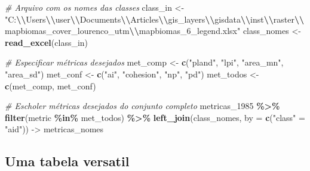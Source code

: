 \documentclass[
]{article}
\newenvironment{Shaded}{\begin{snugshade}}{\end{snugshade}}
\newcommand{\AttributeTok}[1]{\textcolor[rgb]{0.13,0.29,0.53}{#1}}
\newcommand{\CommentTok}[1]{\textcolor[rgb]{0.56,0.35,0.01}{\textit{#1}}}
\newcommand{\FunctionTok}[1]{\textcolor[rgb]{0.13,0.29,0.53}{\textbf{#1}}}
\newcommand{\NormalTok}[1]{#1}
\newcommand{\OtherTok}[1]{\textcolor[rgb]{0.56,0.35,0.01}{#1}}
\newcommand{\SpecialCharTok}[1]{\textcolor[rgb]{0.81,0.36,0.00}{\textbf{#1}}}
\newcommand{\StringTok}[1]{\textcolor[rgb]{0.31,0.60,0.02}{#1}}
\begin{document}
\begin{Shaded}
\begin{Highlighting}[]
\CommentTok{\# Arquivo com os nomes das classes}
\NormalTok{class\_in }\OtherTok{\textless{}{-}} \StringTok{"C:}\SpecialCharTok{\textbackslash{}\textbackslash{}}\StringTok{Users}\SpecialCharTok{\textbackslash{}\textbackslash{}}\StringTok{user}\SpecialCharTok{\textbackslash{}\textbackslash{}}\StringTok{Documents}\SpecialCharTok{\textbackslash{}\textbackslash{}}\StringTok{Articles}\SpecialCharTok{\textbackslash{}\textbackslash{}}\StringTok{gis\_layers}\SpecialCharTok{\textbackslash{}\textbackslash{}}\StringTok{gisdata}\SpecialCharTok{\textbackslash{}\textbackslash{}}\StringTok{inst}\SpecialCharTok{\textbackslash{}\textbackslash{}}\StringTok{raster}\SpecialCharTok{\textbackslash{}\textbackslash{}}\StringTok{mapbiomas\_cover\_lourenco\_utm}\SpecialCharTok{\textbackslash{}\textbackslash{}}\StringTok{mapbiomas\_6\_legend.xlsx"}
\NormalTok{class\_nomes }\OtherTok{\textless{}{-}} \FunctionTok{read\_excel}\NormalTok{(class\_in)}

\CommentTok{\# Especificar métricas desejados}
\NormalTok{met\_comp }\OtherTok{\textless{}{-}} \FunctionTok{c}\NormalTok{(}\StringTok{"pland"}\NormalTok{, }\StringTok{"lpi"}\NormalTok{, }\StringTok{"area\_mn"}\NormalTok{, }\StringTok{"area\_sd"}\NormalTok{)}
\NormalTok{met\_conf }\OtherTok{\textless{}{-}} \FunctionTok{c}\NormalTok{(}\StringTok{"ai"}\NormalTok{, }\StringTok{"cohesion"}\NormalTok{, }\StringTok{"np"}\NormalTok{, }\StringTok{"pd"}\NormalTok{)}
\NormalTok{met\_todos }\OtherTok{\textless{}{-}} \FunctionTok{c}\NormalTok{(met\_comp, met\_conf)}

\CommentTok{\# Escholer métricas desejados do conjunto completo}
\NormalTok{metricas\_1985 }\SpecialCharTok{\%\textgreater{}\%} 
\FunctionTok{filter}\NormalTok{(metric }\SpecialCharTok{\%in\%}\NormalTok{ met\_todos) }\SpecialCharTok{\%\textgreater{}\%} 
\FunctionTok{left\_join}\NormalTok{(class\_nomes, }\AttributeTok{by =} \FunctionTok{c}\NormalTok{(}\StringTok{"class"} \OtherTok{=} \StringTok{"aid"}\NormalTok{)) }\OtherTok{{-}\textgreater{}}\NormalTok{ metricas\_nomes}
\end{Highlighting}
\end{Shaded}

\newpage

\hypertarget{uma-tabela-versatil}{%
\subsection{Uma tabela versatil}\label{uma-tabela-versatil}}
\end{document}

